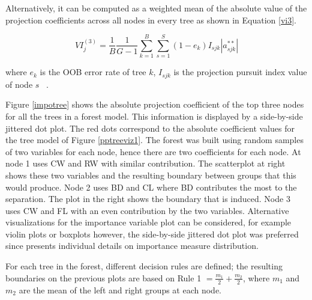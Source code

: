 \documentclass[smallextended,natbib]{svjour3}\usepackage[]{graphicx}\usepackage[]{xcolor}
\begin{document}
Alternatively, it can be computed as a weighted mean of the absolute value of the projection coefficients across all nodes in every tree as shown in Equation \ref{vi3}.

\begin{equation}
VI^{(3)}_j=\frac{1}{B}\frac{1}{G-1}\sum_{k=1}^B\sum_{s = 1}^{S} (1-e_k) I_{sjk}|a^{**}_{sjk}|
\label{vi3}
\end{equation}

\noindent where $e_k$ is the OOB error rate of tree $k$, $I_{sjk}$ is the projection pursuit index value of node $s$ ~\citep{da2021projection}.

Figure \ref{impotree} shows the absolute projection coefficient of the top three nodes for all the trees in a forest model. This information is displayed by a side-by-side jittered dot plot. The red dots correspond to the absolute coefficient values for the tree model of Figure \ref{pptreeviz1}. The forest was built using random samples of two variables for each node, hence there are two coefficients for each node. At node 1 uses CW and RW with similar contribution. The scatterplot at right shows these two variables and the resulting boundary between groups that this would produce. Node 2 uses BD and CL where BD contributes the most to the separation. The plot in the right shows the boundary that is induced. Node 3 uses CW and FL with an even contribution by the two variables. Alternative visualizations for the importance variable plot can be considered, for example violin plots or boxplots however, the side-by-side jittered dot plot was preferred since presents individual details on importance measure distribution.

For each tree in the forest, different decision rules are defined; the resulting boundaries on the previous plots are based on Rule 1 $= \frac{m_1}{2} + \frac{m_2}{2} $, where $m_1$ and $m_2$ are the mean of the left and right groups at each node.
\end{document}

